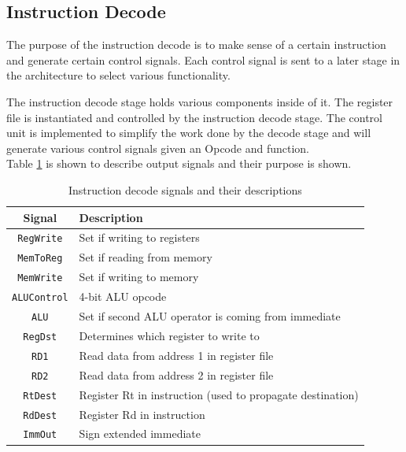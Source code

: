 \documentclass[CMPE]{../KGCOEReport}
\def\code#1{\texttt{#1}}
\begin{document}
    \subsection*{Instruction Decode}

    The purpose of the instruction decode is to make sense of
    a certain instruction and generate certain control signals.
    Each control signal is sent to a later stage in the architecture
    to select various functionality.
    
    The instruction decode stage holds various components inside of it.
    The register file is instantiated and controlled by the instruction
    decode stage.
    The control unit is implemented to simplify the work done by the decode
    stage and will generate various control signals given an Opcode and function.    
    \\
    
    Table \ref{tab:decode_signals} is shown to describe output signals
    and their purpose is shown.
    
    \begin{table}[H]
        \renewcommand{\arraystretch}{1.2}
        \setlength{\tabcolsep}{12pt}
        \caption{Instruction decode signals and their descriptions}
        \begin{center}
            \begin{tabular}{|c|l|}
                \hline
                Signal & Description\\\hline
                \hline
               	\code{RegWrite} & Set if writing to registers\\\hline
               	\code{MemToReg} & Set if reading from memory\\\hline
               	\code{MemWrite} & Set if writing to memory\\\hline
               	\code{ALUControl} & 4-bit ALU opcode\\\hline
               	\code{ALU} & Set if second ALU operator is coming from immediate\\\hline
               	\code{RegDst} & Determines which register to write to\\\hline
               	\code{RD1} & Read data from address 1 in register file\\\hline
               	\code{RD2} & Read data from address 2 in register file\\\hline
               	\code{RtDest} & Register Rt in instruction (used to propagate destination)\\\hline
               	\code{RdDest} & Register Rd in instruction\\\hline
               	\code{ImmOut} & Sign extended immediate\\\hline
               	
            \end{tabular}
        \end{center}
        \label{tab:decode_signals}
    \end{table}
    
\end{document}
